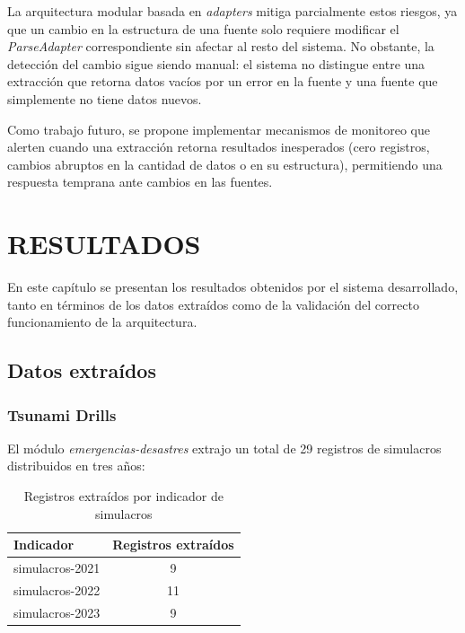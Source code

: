 \documentclass[12pt,letterpaper,oneside]{report}
\begin{document}
La arquitectura modular basada en \textit{adapters} mitiga parcialmente estos riesgos, ya que un cambio en la estructura de una fuente solo requiere modificar el \textit{ParseAdapter} correspondiente sin afectar al resto del sistema. No obstante, la detecci\'on del cambio sigue siendo manual: el sistema no distingue entre una extracci\'on que retorna datos vac\'ios por un error en la fuente y una fuente que simplemente no tiene datos nuevos.

Como trabajo futuro, se propone implementar mecanismos de monitoreo que alerten cuando una extracci\'on retorna resultados inesperados (cero registros, cambios abruptos en la cantidad de datos o en su estructura), permitiendo una respuesta temprana ante cambios en las fuentes.


\chapter{RESULTADOS}
\label{ch:resultados}

En este cap\'itulo se presentan los resultados obtenidos por el sistema desarrollado, tanto en t\'erminos de los datos extra\'idos como de la validaci\'on del correcto funcionamiento de la arquitectura.

\section{Datos extra\'idos}
\label{sec:datos-extraidos}

\subsection{Tsunami Drills}
\label{sec:resultado-td}

El m\'odulo \textit{emergencias-desastres} extrajo un total de 29 registros de simulacros distribuidos en tres a\~nos:

\begin{table}[H]
\centering
\caption{Registros extra\'idos por indicador de simulacros}
\label{tab:registros-simulacros}
\begin{tabular}{|l|c|}
\hline
\textbf{Indicador} & \textbf{Registros extra\'idos} \\
\hline
simulacros-2021 & 9 \\
\hline
simulacros-2022 & 11 \\
\hline
simulacros-2023 & 9 \\
\hline
\end{tabular}
\end{table}
\end{document}
